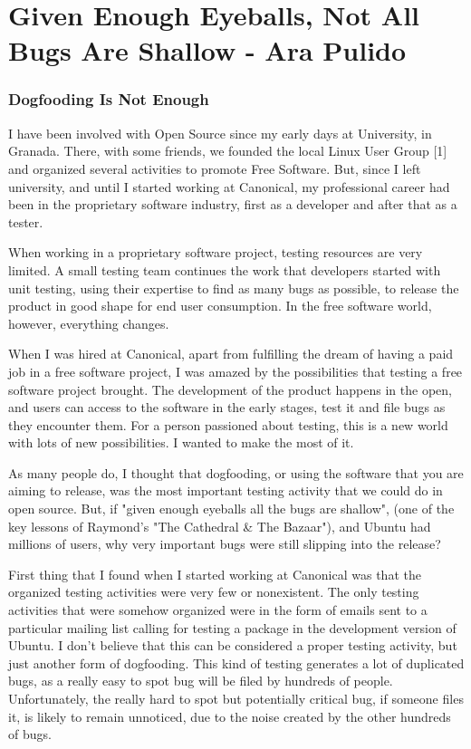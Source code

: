 \chapter{Given Enough Eyeballs, Not All Bugs Are Shallow - Ara Pulido}
\subsection*{Dogfooding Is Not Enough} 

I have been involved with Open Source since my early days at University, in Granada. There, with some friends, we founded the local Linux User Group [1] and organized several activities to promote Free Software. But, since I left university, and until I started working at Canonical, my professional career had been in the proprietary software industry, first as a developer and after that as a tester.

When working in a proprietary software project, testing resources are very limited. A small testing team continues the work that developers started with unit testing, using their expertise to find as many bugs as possible, to release the product in good shape for end user consumption. In the free software world, however, everything changes.

When I was hired at Canonical, apart from fulfilling the dream of having a paid job in a free software project, I was amazed by the possibilities that testing a free software project brought. The development of the product happens in the open, and users can access to the software in the early stages, test it and file bugs as they encounter them. For a person passioned about testing, this is a new world with lots of new possibilities. I wanted to make the most of it.

As many people do, I thought that dogfooding, or using the software that you are aiming to release, was the most important testing activity that we could do in open source. But, if "given enough eyeballs all the bugs are shallow", (one of the key lessons of Raymond's "The Cathedral \& The Bazaar"), and Ubuntu had millions of users, why very important bugs were still slipping into the release?

First thing that I found when I started working at Canonical was that the organized testing activities were very few or nonexistent. The only testing activities that were somehow organized were in the form of emails sent to a particular mailing list calling for testing a package in the development version of Ubuntu. I don't believe that this can be considered a proper testing activity, but just another form of dogfooding. This kind of testing generates a lot of duplicated bugs, as a really easy to spot bug will be filed by hundreds of people. Unfortunately, the really hard to spot but potentially critical bug, if someone files it, is likely to remain unnoticed, due to the noise created by the other hundreds of bugs.

